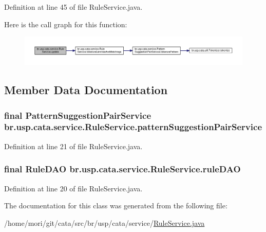 Definition at line 45 of file Rule\+Service.\+java.



Here is the call graph for this function\+:\nopagebreak
\begin{figure}[H]
\begin{center}
\leavevmode
\includegraphics[width=350pt]{classbr_1_1usp_1_1cata_1_1service_1_1_rule_service_a5eabe087a5accd726b4d6458451b8e03_cgraph}
\end{center}
\end{figure}




\subsection{Member Data Documentation}
\hypertarget{classbr_1_1usp_1_1cata_1_1service_1_1_rule_service_a34b6dc002357b8d5f00e47f891a4cf6d}{
\subsubsection[{pattern\+Suggestion\+Pair\+Service}]{\setlength{\rightskip}{0pt plus 5cm}final {\bf Pattern\+Suggestion\+Pair\+Service} br.\+usp.\+cata.\+service.\+Rule\+Service.\+pattern\+Suggestion\+Pair\+Service\hspace{0.3cm}{\ttfamily [private]}}}\label{classbr_1_1usp_1_1cata_1_1service_1_1_rule_service_a34b6dc002357b8d5f00e47f891a4cf6d}


Definition at line 21 of file Rule\+Service.\+java.

\hypertarget{classbr_1_1usp_1_1cata_1_1service_1_1_rule_service_aa3af0042eda8e23666ba9b97bc414dab}{
\subsubsection[{rule\+D\+A\+O}]{\setlength{\rightskip}{0pt plus 5cm}final {\bf Rule\+D\+A\+O} br.\+usp.\+cata.\+service.\+Rule\+Service.\+rule\+D\+A\+O\hspace{0.3cm}{\ttfamily [private]}}}\label{classbr_1_1usp_1_1cata_1_1service_1_1_rule_service_aa3af0042eda8e23666ba9b97bc414dab}


Definition at line 20 of file Rule\+Service.\+java.



The documentation for this class was generated from the following file\+:\begin{DoxyCompactItemize}
\item 
/home/mori/git/cata/src/br/usp/cata/service/\hyperlink{_rule_service_8java}{Rule\+Service.\+java}\end{DoxyCompactItemize}
